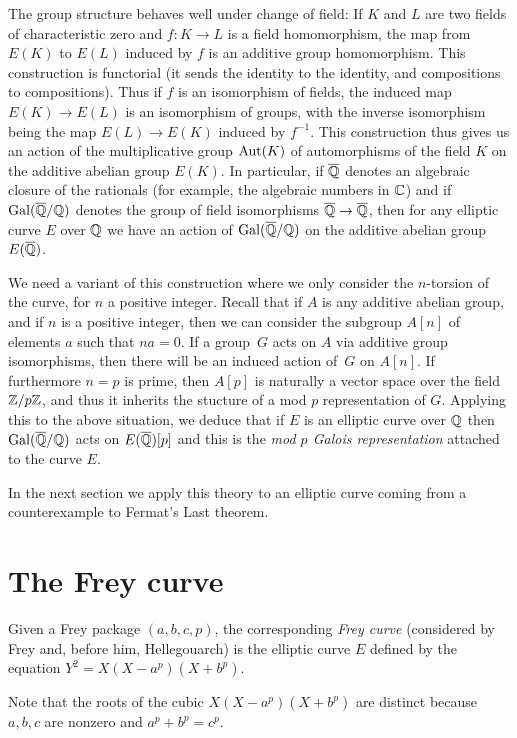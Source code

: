 The group structure behaves well under change of field: If $K$ and $L$ are two fields of characteristic zero and $f:K\to L$ is a field homomorphism, the map from $E(K)$ to $E(L)$ induced by $f$ is an additive group homomorphism. This construction is functorial (it sends the identity to the identity, and compositions to compositions). Thus if $f$ is an isomorphism of fields, the induced map $E(K)\to E(L)$ is an isomorphism of groups, with the inverse isomorphism being the map $E(L)\to E(K)$ induced by $f^{-1}$. This construction thus gives us an action of the multiplicative group $\operatorname{Aut}(K)$ of automorphisms of the field $K$ on the additive abelian group $E(K)$. In particular, if $\overline{\mathbb{Q}}$ denotes an algebraic closure of the rationals (for example, the algebraic numbers in $\mathbb{C}$) and if $\operatorname{Gal}(\overline{\mathbb{Q}}/\mathbb{Q})$ denotes the group of field isomorphisms $\overline{\mathbb{Q}}\to\overline{\mathbb{Q}}$, then for any elliptic curve $E$ over $\mathbb{Q}$ we have an action of $\operatorname{Gal}(\overline{\mathbb{Q}}/\mathbb{Q})$ on the additive abelian group $E(\overline{\mathbb{Q}})$.

We need a variant of this construction where we only consider the $n$-torsion of the curve, for $n$ a positive integer. Recall that if $A$ is any additive abelian group, and if $n$ is a positive integer, then we can consider the subgroup $A[n]$ of elements $a$ such that $na=0$. If a group~$G$ acts on $A$ via additive group isomorphisms, then there will be an induced action of~$G$ on $A[n]$. If furthermore $n=p$ is prime, then $A[p]$ is naturally a vector space over the field $\mathbb{Z}/p\mathbb{Z}$, and thus it inherits the stucture of a mod $p$ representation of $G$. Applying this to the above situation, we deduce that if $E$ is an elliptic curve over $\mathbb{Q}$ then $\operatorname{Gal}(\overline{\mathbb{Q}}/\mathbb{Q})$ acts on $E(\overline{\mathbb{Q}})[p]$ and this is the \emph{mod $p$ Galois representation} attached to the curve $E$.

In the next section we apply this theory to an elliptic curve coming from a counterexample to Fermat's Last theorem.

\section{The Frey curve}

\begin{definition}[Frey]\label{Frey_curve}
  Given a Frey package $(a,b,c,p)$, the corresponding \emph{Frey curve} (considered by Frey and, before him, Hellegouarch) is the elliptic curve $E$ defined by the equation $Y^2=X(X-a^p)(X+b^p).$\end{definition}

Note that the roots of the cubic $X(X-a^p)(X+b^p)$ are distinct because $a,b,c$ are nonzero and $a^p+b^p=c^p$.

